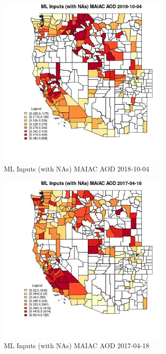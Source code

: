 \clearpage 

\begin{figure} 
\centering  
\includegraphics[width=0.77\textwidth]{Code_Outputs/Report_ML_input_PM25_Step4_part_f_de_duplicated_aves_prioritize_24hr_obswNAs_CountyMAIAC_AODMean2018-10-04.jpg} 
\caption{\label{fig:Report_ML_input_PM25_Step4_part_f_de_duplicated_aves_prioritize_24hr_obswNAsCountyMAIAC_AODMean2018-10-04}ML Inputs (with NAs) MAIAC AOD 2018-10-04} 
\end{figure} 
 

\begin{figure} 
\centering  
\includegraphics[width=0.77\textwidth]{Code_Outputs/Report_ML_input_PM25_Step4_part_f_de_duplicated_aves_prioritize_24hr_obswNAs_CountyMAIAC_AODMean2017-04-18.jpg} 
\caption{\label{fig:Report_ML_input_PM25_Step4_part_f_de_duplicated_aves_prioritize_24hr_obswNAsCountyMAIAC_AODMean2017-04-18}ML Inputs (with NAs) MAIAC AOD 2017-04-18} 
\end{figure} 
 

